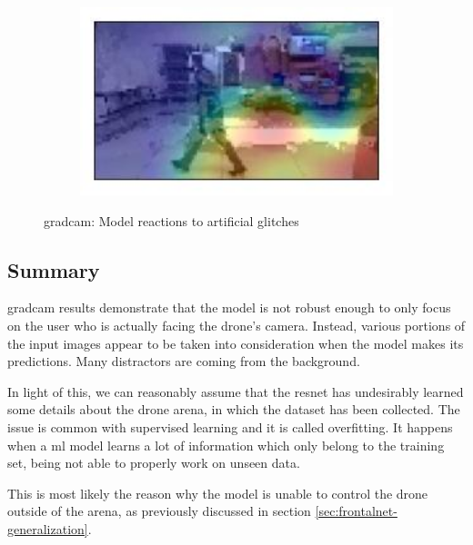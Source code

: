 \begin{figure}[!h]
\begin{center}
\begin{subfigure}[h]{0.24\textwidth}
		\end{subfigure}
		\hfill
		\begin{subfigure}[h]{0.24\textwidth}
			\centering
			\includegraphics[width=1\textwidth]{"contents/images/gradcam/gradcam-glitch-4"}
		\end{subfigure}
	\end{center}
	\vspace{-0.5cm}
	\caption[\gls{gradcam}: Model reactions to artificial glitches]{\gls{gradcam}: Model reactions to artificial glitches}
	\label{fig:gradcam-glitch}
\end{figure}



\subsection{Summary}
\label{subsec:gradcam-summary}

\gls{gradcam} results demonstrate that the model is not robust enough to only focus on the user who is actually facing the drone's camera. Instead, various portions of the input images appear to be taken into consideration when the model makes its predictions. Many distractors are coming from the background.

In light of this, we can reasonably assume that the \gls{resnet} has undesirably learned some details about the drone arena, in which the dataset has been collected. The issue is common with supervised learning and it is called overfitting. It happens when a \gls{ml} model learns a lot of information which only belong to the training set, being not able to properly work on unseen data.

This is most likely the reason why the model is unable to control the drone outside of the arena, as previously discussed in section \ref{sec:frontalnet-generalization}.




